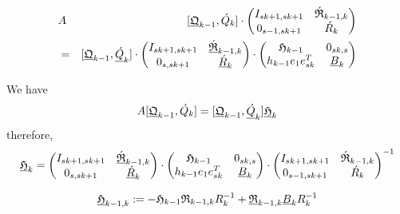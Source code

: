 \documentclass{scrartcl}
\begin{document}
\begin{eqnarray*}
&A& [\underline{\frak{Q}}_{k - 1}, \acute{Q}_k] \cdot 
\begin{pmatrix}
	I_{sk + 1, sk + 1} & \acute{\frak{R}}_{k - 1, k} \\
	0_{s - 1, sk + 1} &\acute{R}_k \\
\end{pmatrix} \\
&=& [ \underline{\frak{Q}}_{k - 1}, \underline{\acute{Q}}_k ] \cdot 
\begin{pmatrix}
	I_{sk + 1, sk + 1} & \underline{\acute{\frak{R}}}_{k - 1, k} \\
	0_{s, sk + 1} & \underline{\acute{R}}_k \\
\end{pmatrix} \cdot
\begin{pmatrix}
	\frak{H}_{k - 1} & 0_{sk, s} \\
	h_{k - 1} e_1 e^T_{sk} & \underline{B}_k \\
\end{pmatrix}
\end{eqnarray*}

We have
\begin{eqnarray*}
	A [\underline{\frak{Q}}_{k - 1}, \acute{Q}_k] = [ \underline{\frak{Q}}_{k - 1}, \underline{\acute{Q}}_k ] \underline{\frak{H}}_k
\end{eqnarray*}
therefore,
\begin{eqnarray*}
	\underline{\frak{H}}_k = 
	\begin{pmatrix}
		I_{sk + 1, sk + 1} & \underline{\acute{\frak{R}}}_{k - 1, k} \\
		0_{s, sk + 1} & \underline{\acute{R}}_k \\
	\end{pmatrix} \cdot
	\begin{pmatrix}
		\frak{H}_{k - 1} & 0_{sk, s} \\
		h_{k - 1} e_1 e^T_{sk} & \underline{B}_k \\
	\end{pmatrix} \cdot
	\begin{pmatrix}
		I_{sk + 1, sk + 1} & \acute{\frak{R}}_{k - 1, k} \\
		0_{s - 1, sk + 1} &\acute{R}_k \\
	\end{pmatrix}^{-1}
\end{eqnarray*}

\begin{equation}\label{eq:h_blackletter_k_}
\underline{\frak{H}}_{k - 1, k} := -\frak{H}_{k - 1} \frak{R}_{k - 1, k} R^{-1}_k + \underline{\frak{R}}_{k - 1, k} \underline{B}_k R^{-1}_k
\end{equation}
\end{document}
